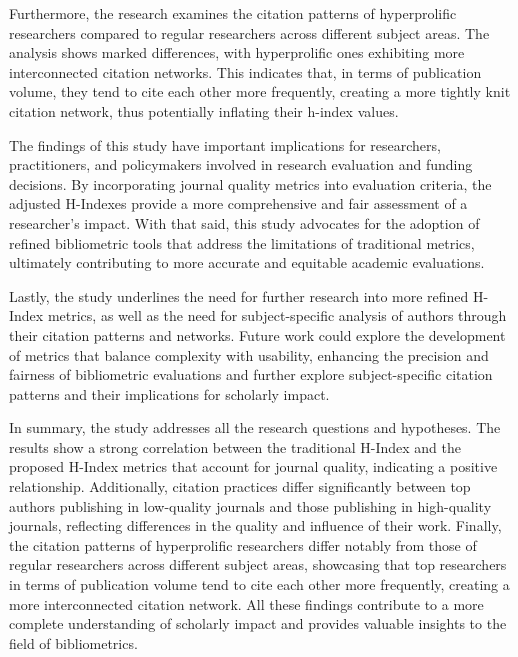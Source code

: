 Furthermore, the research examines the citation patterns of hyperprolific
researchers compared to regular researchers across different subject areas. The
analysis shows marked differences, with hyperprolific ones exhibiting more
interconnected citation networks. This indicates that, in terms of publication
volume, they tend to cite each other more frequently, creating a more tightly
knit citation network, thus potentially inflating their h-index values.

The findings of this study have important implications for researchers,
practitioners, and policymakers involved in research evaluation and funding
decisions. By incorporating journal quality metrics into evaluation criteria,
the adjusted H-Indexes provide a more comprehensive and fair assessment of a
researcher’s impact. With that said, this study advocates for the adoption of
refined bibliometric tools that address the limitations of traditional metrics,
ultimately contributing to more accurate and equitable academic evaluations.

Lastly, the study underlines the need for further research into more refined
H-Index metrics, as well as the need for subject-specific analysis of authors
through their citation patterns and networks. Future work could explore the
development of metrics that balance complexity with usability, enhancing the
precision and fairness of bibliometric evaluations and further explore
subject-specific citation patterns and their implications for scholarly impact.

In summary, the study addresses all the research questions and hypotheses. The
results show a strong correlation between the traditional H-Index and the
proposed H-Index metrics that account for journal quality, indicating a
positive relationship. Additionally, citation practices differ significantly
between top authors publishing in low-quality journals and those publishing in
high-quality journals, reflecting differences in the quality and influence of
their work. Finally, the citation patterns of hyperprolific researchers differ
notably from those of regular researchers across different subject areas,
showcasing that top researchers in terms of publication volume tend to cite
each other more frequently, creating a more interconnected citation network.
All these findings contribute to a more complete understanding of scholarly
impact and provides valuable insights to the field of bibliometrics.


